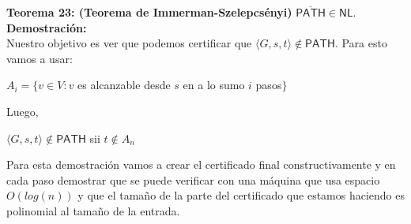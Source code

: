 \documentclass{article}
\begin{document}
\begin{flushleft}
  \textbf{Teorema 23: \hypertarget{immerman}{\textcolor{Bittersweet}{(Teorema de Immerman-Szelepcsényi)}}}
  $\overline{\mathsf{PATH}} \in \mathsf{NL}$. \\[0.5em]

  \textbf{\textcolor{Mulberry}{Demostración:}} \\[0.5em]

  Nuestro objetivo es ver que podemos certificar que $\langle G,s,t \rangle \not\in \mathsf{PATH}$. Para esto vamos a  
  usar:
\end{flushleft}
\begin{center}
  $A_i = \{ v \in V : v$ es alcanzable desde $s$ en a lo sumo $i$ pasos$\}$
\end{center}
\begin{flushleft}
  Luego,
\end{flushleft}
\begin{center}
  $\langle G, s, t \rangle \not\in \mathsf{PATH}$ sii $t \not\in A_n$
\end{center}
\begin{flushleft}
  Para esta demostración vamos a crear el certificado final constructivamente y en cada paso demostrar que se puede 
  verificar con una máquina que usa espacio $O(log(n))$ y que el tamaño de la parte del certificado que estamos haciendo
  es polinomial al tamaño de la entrada.
\end{flushleft}
\end{document}
